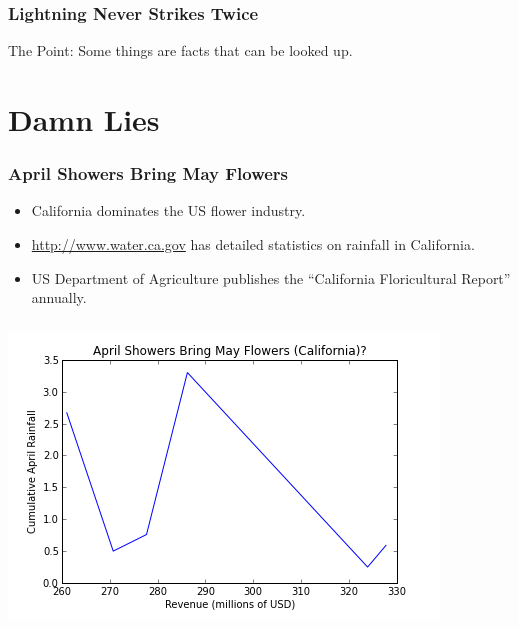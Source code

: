 \documentclass{beamer}
\begin{document}
\begin{frame}
\frametitle{Lightning Never Strikes Twice}
\begin{center}
\end{center}
The Point:  Some things are facts that can be looked up.
\end{frame}


\section{Damn Lies}

\begin{frame}
\frametitle{April Showers Bring May Flowers}
\begin{itemize}
    \item California dominates the US flower industry.
    \item \url{http://www.water.ca.gov} has detailed statistics on rainfall in
        California.
    \item US Department of Agriculture publishes the ``California Floricultural
        Report'' annually.
\end{itemize}
\end{frame}


\begin{frame}
\frametitle{}
\begin{center}
    \includegraphics[width=\hsize]{art/april_showers.png}
\end{center}
\end{frame}
\end{document}
